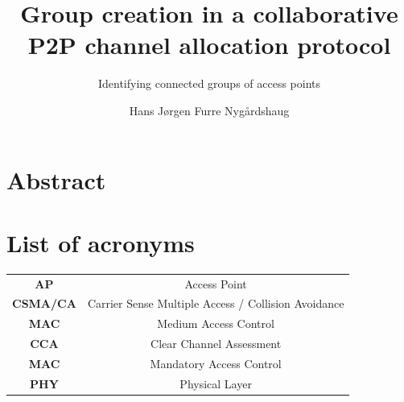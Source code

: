 \documentclass[a4paper,UKenglish]{report}
\title{Group creation in a collaborative P2P channel allocation protocol}
\subtitle{Identifying connected groups of access points}
\author{Hans Jørgen Furre Nygårdshaug}
\begin{document}
\duoforside[dept={Institutt for informatikk},
  program={Informatikk: programmering og nettverk},
  long]
\section*{Abstract}

\clearpage
\section*{List of acronyms}
\begin{tabular}{ c c }
	\textbf{AP} & Access Point\\ 
	\textbf{CSMA/CA} & Carrier Sense Multiple Access / Collision Avoidance\\
	\textbf{MAC} & Medium Access Control\\
	\textbf{CCA} & Clear Channel Assessment\\
	\textbf{MAC} & Mandatory Access Control\\
	\textbf{PHY} & Physical Layer\\
\end{tabular}
\tableofcontents

\end{document}
